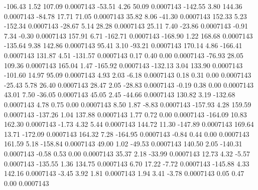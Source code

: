      -106.43        1.52      107.09     0.0007143
      -53.51        4.26       50.09     0.0007143
     -142.55        3.80      144.36     0.0007143
      -84.78       17.71       71.05     0.0007143
       35.82        8.06      -41.30     0.0007143
      152.33        5.23     -152.34     0.0007143
      -28.67        5.14       28.28     0.0007143
       25.11        7.40      -23.86     0.0007143
       -0.91        7.34       -0.30     0.0007143
      157.91        6.71     -162.71     0.0007143
     -168.90        1.22      168.68     0.0007143
     -135.64        9.38      142.86     0.0007143
       95.41        3.10      -93.21     0.0007143
      170.14        4.86     -166.41     0.0007143
      131.87        4.51     -131.57     0.0007143
        0.17        0.40        0.00     0.0007143
      -76.93       28.05      109.36     0.0007143
      165.04        1.47     -165.92     0.0007143
     -132.13        3.04      133.90     0.0007143
     -101.60       14.97       95.09     0.0007143
        4.93        2.03       -6.18     0.0007143
        0.18        0.31        0.00     0.0007143
      -25.43        5.78       26.40     0.0007143
       28.47        2.05      -28.83     0.0007143
       -0.19        0.38        0.00     0.0007143
       43.01        7.50      -36.05     0.0007143
       45.05        2.45      -44.66     0.0007143
      130.82        3.19     -132.68     0.0007143
        4.78        0.75        0.00     0.0007143
        8.50        1.87       -8.83     0.0007143
     -157.93        4.28      159.59     0.0007143
     -137.26        1.04      137.88     0.0007143
        1.77        0.72        0.00     0.0007143
     -164.09       10.83      162.30     0.0007143
       -1.73        4.32        5.44     0.0007143
      144.72       11.30     -147.89     0.0007143
      169.64       13.71     -172.09     0.0007143
      164.32        7.28     -164.95     0.0007143
       -0.84        0.44        0.00     0.0007143
      161.59        5.18     -158.84     0.0007143
       49.00        1.02      -49.53     0.0007143
      140.50        2.05     -140.31     0.0007143
       -0.58        0.53        0.00     0.0007143
       35.37        2.18      -33.99     0.0007143
       12.73        4.32       -5.57     0.0007143
     -135.55        1.36      134.75     0.0007143
        6.70       17.22       -7.72     0.0007143
     -145.88        4.33      142.16     0.0007143
       -3.45        3.92        1.81     0.0007143
        1.94        3.41       -3.78     0.0007143
        0.05        0.47        0.00     0.0007143
